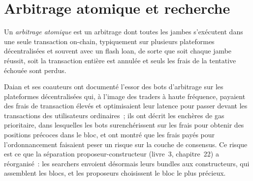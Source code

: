 \section{Arbitrage atomique et recherche}

\begin{definition}\label{def:hf:on-chain-trading:atomic}
Un \emph{arbitrage atomique} est un arbitrage dont toutes les jambes s'exécutent dans une seule transaction on-chain, typiquement sur plusieurs plateformes décentralisées
et souvent avec un flash loan, de sorte que soit chaque jambe réussit, soit la transaction entière est annulée et seuls les frais de la
tentative échouée sont perdus.
\end{definition}

Daian et ses coauteurs ont documenté l'essor des bots d'arbitrage sur les plateformes décentralisées qui, à l'image des traders à haute fréquence, payaient des frais de transaction élevés
et optimisaient leur latence pour passer devant les transactions des utilisateurs ordinaires~; ils ont décrit les enchères de gas prioritaire, dans lesquelles les bots surenchérissent sur les frais pour obtenir des
positions précoces dans le bloc, et ont montré que les frais payés pour l'ordonnancement faisaient peser un risque sur la couche de consensus. Ce risque est ce que la séparation proposeur-constructeur
(livre~3, chapitre~22) a réorganisé~: les searchers envoient désormais leurs bundles aux constructeurs, qui assemblent les blocs, et les proposeurs choisissent le bloc le plus
précieux.

\begin{omfigure}

\label{fig:hf:on-chain-trading:pipeline}
\end{omfigure}

